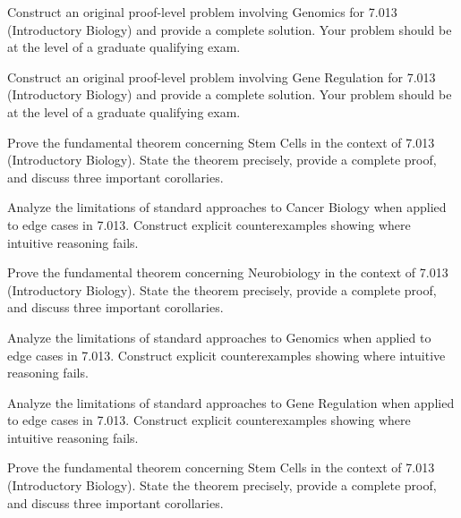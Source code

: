 \documentclass[12pt,a4paper]{exam}
\begin{document}
\begin{questions}

\question[2]
Construct an original proof-level problem involving Genomics for 7.013 (Introductory Biology) and provide a complete solution. Your problem should be at the level of a graduate qualifying exam.

\vspace{0.3cm}

\question[2]
Construct an original proof-level problem involving Gene Regulation for 7.013 (Introductory Biology) and provide a complete solution. Your problem should be at the level of a graduate qualifying exam.

\vspace{0.3cm}

\question[5]
Prove the fundamental theorem concerning Stem Cells in the context of 7.013 (Introductory Biology). State the theorem precisely, provide a complete proof, and discuss three important corollaries.

\vspace{0.3cm}

\question[3]
Analyze the limitations of standard approaches to Cancer Biology when applied to edge cases in 7.013. Construct explicit counterexamples showing where intuitive reasoning fails.

\vspace{0.3cm}

\question[2]
Prove the fundamental theorem concerning Neurobiology in the context of 7.013 (Introductory Biology). State the theorem precisely, provide a complete proof, and discuss three important corollaries.

\vspace{0.3cm}

\question[6]
Analyze the limitations of standard approaches to Genomics when applied to edge cases in 7.013. Construct explicit counterexamples showing where intuitive reasoning fails.

\vspace{0.3cm}

\question[5]
Analyze the limitations of standard approaches to Gene Regulation when applied to edge cases in 7.013. Construct explicit counterexamples showing where intuitive reasoning fails.

\vspace{0.3cm}

\question[4]
Prove the fundamental theorem concerning Stem Cells in the context of 7.013 (Introductory Biology). State the theorem precisely, provide a complete proof, and discuss three important corollaries.


\end{questions}
\end{document}
